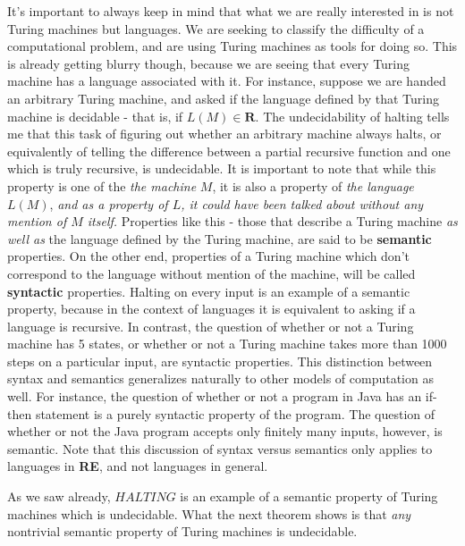 \par It's important to always keep in mind that what we are really interested in is not Turing machines but languages. We are seeking to classify the difficulty of a computational problem, and are using Turing machines as tools for doing so. This is already getting blurry though, because we are seeing that every Turing machine has a language associated with it. For instance, suppose we are handed an arbitrary Turing machine, and asked if the language defined by that Turing machine is decidable - that is, if $L(M) \in \textbf{R}$. The undecidability of halting tells me that this task of figuring out whether an arbitrary machine always halts, or equivalently of telling the difference between a partial recursive function and one which is truly recursive, is undecidable. It is important to note that while this property is one of the \textit{the machine} $M$, it is also a property of \textit{the language} $L(M)$, \textit{and as a property of $L$, it could have been talked about without any mention of $M$ itself.} Properties like this - those that describe a Turing machine \textit{as well as} the language defined by the Turing machine, are said to be \textbf{semantic} properties. On the other end, properties of a Turing machine which don't correspond to the language without mention of the machine, will be called \textbf{syntactic} properties. Halting on every input is an example of a semantic property, because in the context of languages it is equivalent to asking if a language is recursive. In contrast, the question of whether or not a Turing machine has 5 states, or whether or not a Turing machine takes more than 1000 steps on a particular input, are syntactic properties. This distinction between syntax and semantics generalizes naturally to other models of computation as well. For instance, the question of whether or not a program in Java has an if-then statement is a purely syntactic property of the program. The question of whether or not the Java program accepts only finitely many inputs, however, is semantic. Note that this discussion of syntax versus semantics only applies to languages in \textbf{RE}, and not languages in general.
\par As we saw already, $HALTING$ is an example of a semantic property of Turing machines which is undecidable. What the next theorem shows is that \textit{any} nontrivial semantic property of Turing machines is undecidable.
